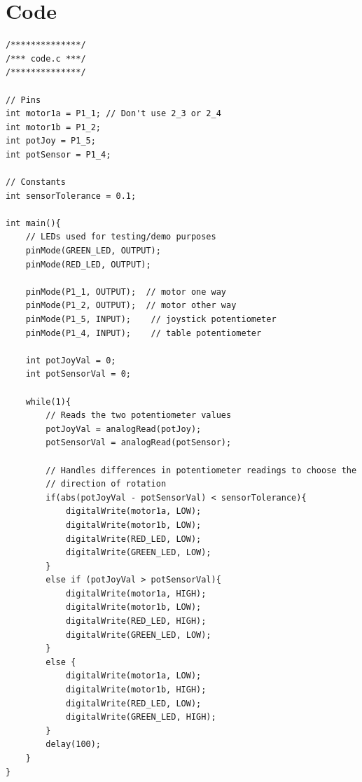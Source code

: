 \documentclass[a4paper, 11pt]{article}
\begin{document}
\section{Code}
	\begin{lstlisting}
/**************/
/*** code.c ***/
/**************/
				
// Pins
int motor1a = P1_1; // Don't use 2_3 or 2_4
int motor1b = P1_2;
int potJoy = P1_5;
int potSensor = P1_4;
		
// Constants
int sensorTolerance = 0.1;
		
int main(){
	// LEDs used for testing/demo purposes
	pinMode(GREEN_LED, OUTPUT);
	pinMode(RED_LED, OUTPUT);
	
	pinMode(P1_1, OUTPUT);  // motor one way
	pinMode(P1_2, OUTPUT);  // motor other way
	pinMode(P1_5, INPUT);    // joystick potentiometer
	pinMode(P1_4, INPUT);    // table potentiometer
	
	int potJoyVal = 0;
	int potSensorVal = 0;
			
	while(1){
		// Reads the two potentiometer values
		potJoyVal = analogRead(potJoy);
		potSensorVal = analogRead(potSensor);
				
		// Handles differences in potentiometer readings to choose the
		// direction of rotation
		if(abs(potJoyVal - potSensorVal) < sensorTolerance){
			digitalWrite(motor1a, LOW);
			digitalWrite(motor1b, LOW);
			digitalWrite(RED_LED, LOW);
			digitalWrite(GREEN_LED, LOW);
		}
		else if (potJoyVal > potSensorVal){
			digitalWrite(motor1a, HIGH);
			digitalWrite(motor1b, LOW);
			digitalWrite(RED_LED, HIGH);
			digitalWrite(GREEN_LED, LOW);
		}
		else {
			digitalWrite(motor1a, LOW);
			digitalWrite(motor1b, HIGH);
			digitalWrite(RED_LED, LOW);
			digitalWrite(GREEN_LED, HIGH);
		}
		delay(100);
	}
}
	\end{lstlisting}
\end{document}
